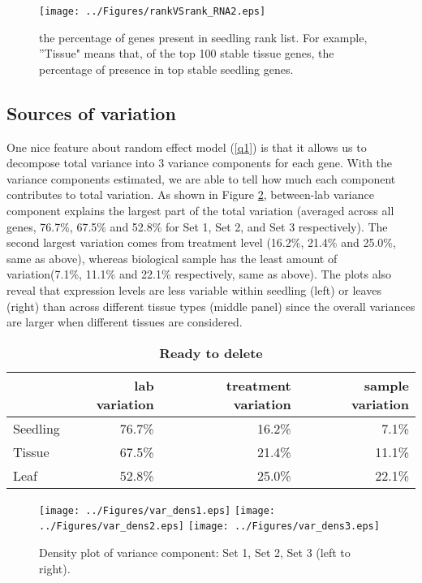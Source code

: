 \documentclass[11pt, a4paper]{article}
\begin{document}
 \begin{figure}[h!]
\begin{center}
\texttt{[image: ../Figures/rankVSrank\_RNA2.eps]}
\caption{\label{fig:rankVSrank_RNA} the percentage of genes present in seedling rank list. For example, ''Tissue" means that, of the top 100 stable tissue genes, the percentage of presence in top stable seedling genes.}
\end{center}
\end{figure}



  \subsection{Sources of variation}
 One nice feature about random effect model (\ref{q1}) is that it allows us to decompose total variance into 3 variance components for each gene. With the variance components estimated, we are able to tell how much each component contributes to total variation.  As shown in Figure \ref{densityplot}, between-lab variance component explains the largest part of the total variation (averaged across all genes, 76.7\%, 67.5\% and 52.8\%  for Set 1, Set 2, and Set 3 respectively).  The second largest variation comes from treatment level (16.2\%, 21.4\% and 25.0\%, same as above), whereas biological sample has the least amount of variation(7.1\%, 11.1\% and 22.1\% respectively, same as above).  The plots also reveal that expression levels are less variable within seedling (left) or leaves (right) than across different tissue types (middle panel) since the overall variances are larger when different tissues are considered.  

\begin{center}
\begin{table}[h]
\centering
\begin{tabular}{lrrr} \hline
&lab variation & treatment variation & sample variation  \\  \hline
Seedling  &76.7\% &16.2\% &7.1\%  \\
   Tissue  &67.5\% &21.4\% &11.1\%  \\
     Leaf   &52.8\% &25.0\% &22.1\% \\ \hline
\end{tabular}
\caption{\textbf{Ready to delete}}
\label{table:percentageofvariation}
\end{table}
\end{center} 
 
 \begin{figure}[h]
\begin{center}
\texttt{[image: ../Figures/var\_dens1.eps]}
\texttt{[image: ../Figures/var\_dens2.eps]}
\texttt{[image: ../Figures/var\_dens3.eps]}
\caption{\label{densityplot} Density plot of variance component: Set 1, Set 2, Set 3 (left to right).}
\end{center}
\end{figure} 
\end{document}

